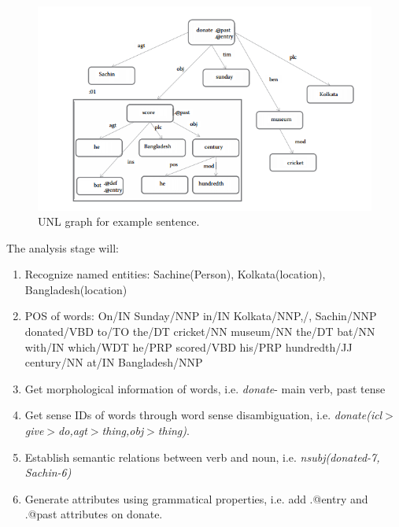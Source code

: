     \begin{figure}
        \centering
        \includegraphics[scale=0.6]{Images/unl}
        \caption{UNL graph for example sentence.}
        \label{fig:unl}
    \end{figure}
    The analysis stage will:
    \begin{enumerate}
    \item Recognize named entities: Sachine(Person), Kolkata(location), Bangladesh(location)
    
    \item POS of words: On/IN Sunday/NNP in/IN Kolkata/NNP,/, Sachin/NNP donated/VBD to/TO the/DT cricket/NN museum/NN the/DT bat/NN with/IN which/WDT he/PRP scored/VBD his/PRP hundredth/JJ century/NN at/IN Bangladesh/NNP
  
    \item Get morphological information of words, i.e. \textit{donate}- main verb, past tense
    
    \item Get sense IDs of words through word sense disambiguation, i.e. \textit{donate(icl$>$give$>$do,agt$>$thing,obj$>$thing)}.
    
    \item Establish semantic relations between verb and noun, i.e. \textit{nsubj(donated-7, Sachin-6)}
    
    \item Generate attributes using grammatical properties, i.e. add .@entry and .@past attributes on donate.
    \end{enumerate}
    
